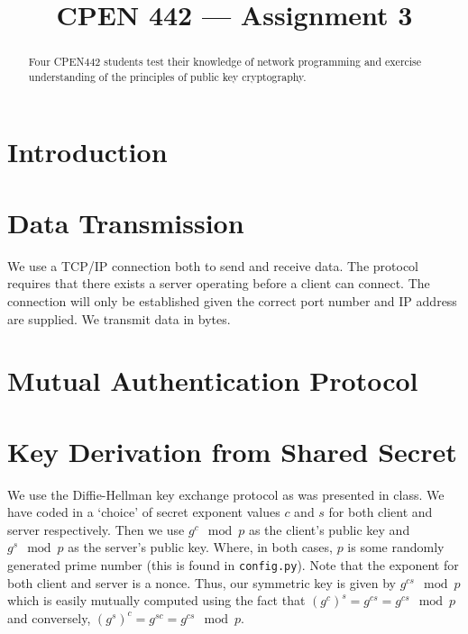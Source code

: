 \documentclass[conference]{IEEEtran}
\begin{document}
\title{CPEN 442 --- Assignment 3}


\author{
\and
{}
}


\maketitle

\begin{abstract}
Four CPEN442 students test their knowledge of network programming and exercise understanding of the principles of public key cryptography. 
\end{abstract}



\section{Introduction}

\section{Data Transmission}
We use a TCP/IP connection both to send and receive data. The protocol requires that there exists a server operating before a client can connect. The connection will only be established given the correct port number and IP address are supplied. We transmit data in bytes. 
\section{Mutual Authentication Protocol}

\section{Key Derivation from Shared Secret}
We use the Diffie-Hellman key exchange protocol as was presented in class. We have coded in a `choice' of secret exponent values $c$ and $s$ for both client and server respectively. Then we use $g^c\mod p$ as the client's public key and $g^s\mod p$ as the server's public key. Where, in both cases, $p$ is some randomly generated prime number (this is found in {\tt config.py}). Note that the exponent for both client and server is a nonce. Thus, our symmetric key is given by $g^{cs}\mod p$ which is easily mutually computed using the fact that $(g^c)^s = g^{cs} = g^{cs}\mod p$ and conversely, $(g^s)^c = g^{sc} = g^{cs}\mod p$.
\end{document}
